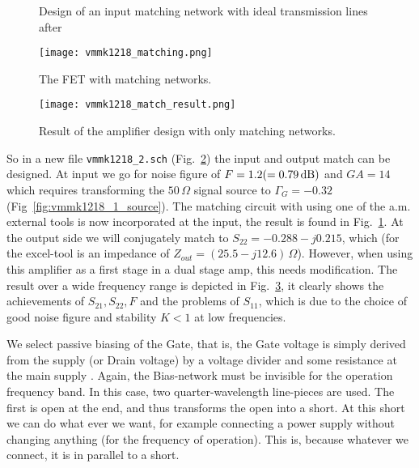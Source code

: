 \begin{figure}
  \centering
  \caption{Design of an input matching network with ideal transmission
    lines after \cite{ibdrigodwn}}
  \label{fig:vmmk1218_input_match}
\end{figure}

\begin{figure}
  \centering
  {\texttt{[image: vmmk1218\_matching.png]}}
  \caption{The FET with matching networks.}
  \label{fig:vmmk1218_matching}
\end{figure}

\begin{figure}
  \centering
  {\texttt{[image: vmmk1218\_match\_result.png]}}
  \caption{Result of the amplifier design with only matching networks.}
  \label{fig:vmmk1218_match_result}
\end{figure}

So in a new file {\tt vmmk1218\_2.sch}
(Fig.~\ref{fig:vmmk1218_matching}) the input and output match can be
designed. At input we go for noise figure of $F=1.2(=0.79\,\mathrm{dB})$
and $GA=14$ which requires transforming the $50\,\Omega$ signal source
to $\Gamma_G=-0.32$ (Fig~\ref{fig:vmmk1218_1_source}). The matching
circuit with using one of the a.m. external tools is now incorporated
at the input, the result is found in
Fig.~\ref{fig:vmmk1218_input_match}. At the output side we will
conjugately match to $S_{22}=-0.288-j0.215$, which (for the excel-tool
is an impedance of $Z_{out}=(25.5-j12.6)\,\Omega$). However, when
using this amplifier as a first stage in a dual stage amp, this needs
modification. The result over a wide frequency range is depicted in
Fig.~\ref{fig:vmmk1218_match_result}, it clearly shows the achievements
of $S_{21},S_{22}, F$ and the problems of $S_{11}$, which is due to
the choice of good noise figure and stability $K<1$ at low
frequencies.

\label{ch:bias1}

We select passive biasing of the Gate, that is, the Gate voltage is
simply derived from the supply (or Drain voltage) by a voltage divider
and some resistance at the main supply \cite{avago_an5385}. Again, the
Bias-network must be invisible for the operation frequency band. In
this case, two quarter-wavelength line-pieces are used. The first is
open at the end, and thus transforms the open into a short. At this
short we can do what ever we want, for example connecting a power
supply without changing anything (for the frequency of
operation). This is, because whatever we connect, it is in parallel to
a short. 

